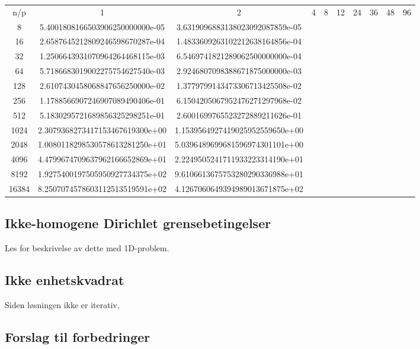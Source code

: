 \documentclass{article}
\begin{document}
\begin{table}
\begin{tabular}{c | c c c c c c c c c}

n/p & 1 & 2 & 4 & 8 & 12 & 24 & 36 & 48 & 96 \\
8 &	5.4001808166503906250000000e-05 & 3.6319096883138023092087859e-05 \\
16 &    2.6587645212809246598670287e-04 & 1.4833609263102212638164856e-04 \\
32 &    1.2506643931070964264468115e-03 & 6.5469741821289062500000000e-04 \\
64 &    5.7186683019002275754627540e-03 & 2.9246807098388671875000000e-03 \\
128 &   2.6107430458068847656250000e-02 & 1.3779799143473306713425508e-02 \\
256 &   1.1788566907246907089490406e-01 & 6.1504205067952476271297968e-02 \\
512 &   5.1830295721689856325298251e-01 & 2.6001699765523272889211626e-01 \\
1024 &  2.3079368273417153467619300e+00 & 1.1539564927419025952559650e+00 \\
2048 &  1.0080118298530578613281250e+01 & 5.0396489699681596974301101e+00 \\
4096 &	4.4799674709637962166652869e+01 & 2.2249505241711933223314190e+01 \\
8192 &	1.9275400197505950927734375e+02 & 9.6106613675753280290336988e+01 \\
16384 &	8.2507074578603112513519591e+02 & 4.1267060649394989013671875e+02 \\











\end{tabular}
\end{table}

\subsection{Ikke-homogene Dirichlet grensebetingelser}
Les \cite[seksjon 3.2]{poisson-fdm} for beskrivelse av dette med 1D-problem.

\subsection{Ikke enhetskvadrat}
Siden løsningen ikke er iterativ, 
\subsection{Forslag til forbedringer}


\end{document}
